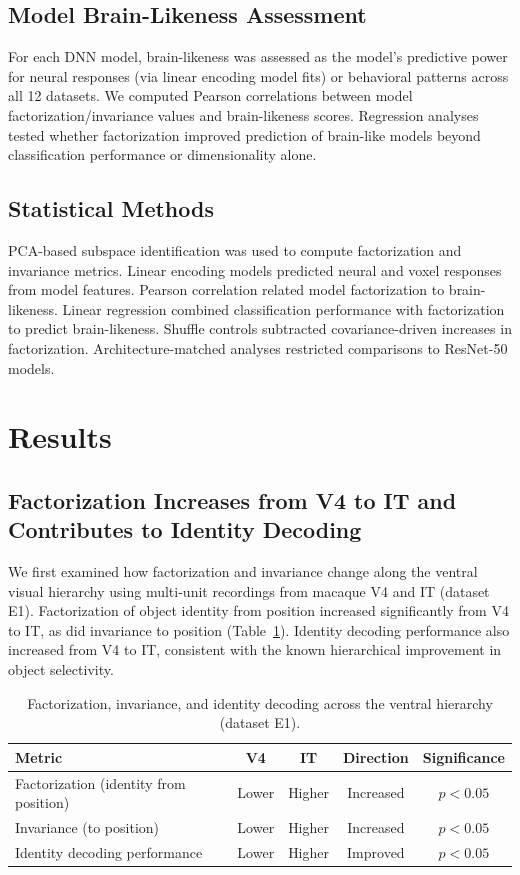 \documentclass[11pt]{article}
\begin{document}
\subsection{Model Brain-Likeness Assessment}

For each DNN model, brain-likeness was assessed as the model's predictive power for neural responses (via linear encoding model fits) or behavioral patterns across all 12 datasets. We computed Pearson correlations between model factorization/invariance values and brain-likeness scores. Regression analyses tested whether factorization improved prediction of brain-like models beyond classification performance or dimensionality alone.

\subsection{Statistical Methods}

PCA-based subspace identification was used to compute factorization and invariance metrics. Linear encoding models predicted neural and voxel responses from model features. Pearson correlation related model factorization to brain-likeness. Linear regression combined classification performance with factorization to predict brain-likeness. Shuffle controls subtracted covariance-driven increases in factorization. Architecture-matched analyses restricted comparisons to ResNet-50 models.

\section{Results}

\subsection{Factorization Increases from V4 to IT and Contributes to Identity Decoding}

We first examined how factorization and invariance change along the ventral visual hierarchy using multi-unit recordings from macaque V4 and IT (dataset E1). Factorization of object identity from position increased significantly from V4 to IT, as did invariance to position (Table~\ref{tab:v4it}). Identity decoding performance also increased from V4 to IT, consistent with the known hierarchical improvement in object selectivity.

\begin{table}[htbp]
\centering
\caption{Factorization, invariance, and identity decoding across the ventral hierarchy (dataset E1).}
\label{tab:v4it}
\begin{tabular}{lcccc}
\toprule
Metric & V4 & IT & Direction & Significance \\
\midrule
Factorization (identity from position) & Lower & Higher & Increased & $p < 0.05$ \\
Invariance (to position) & Lower & Higher & Increased & $p < 0.05$ \\
Identity decoding performance & Lower & Higher & Improved & $p < 0.05$ \\
\bottomrule
\end{tabular}
\end{table}
\end{document}
